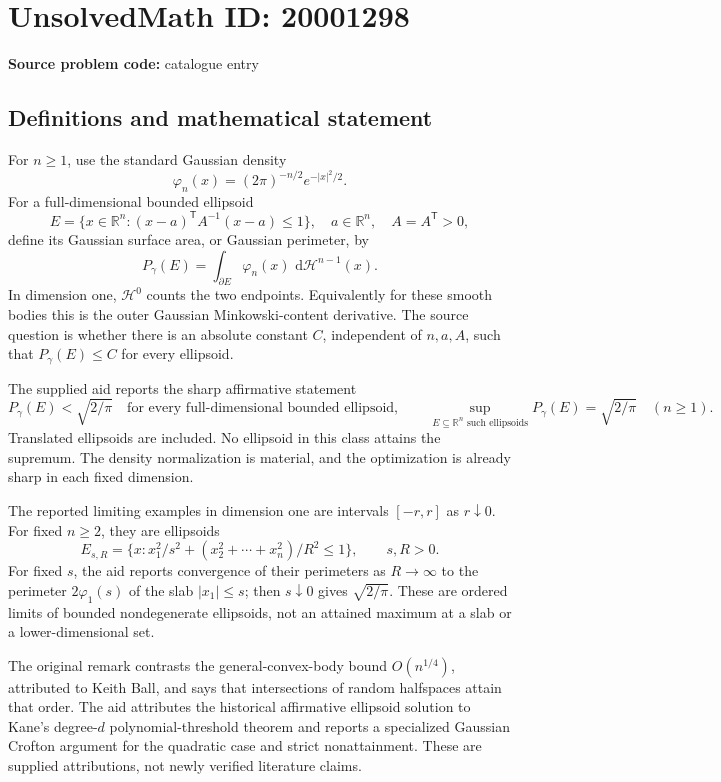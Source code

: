\documentclass[11pt]{article}
\newcommand{\R}{\mathbb{R}}
\newcommand{\dd}{\,\mathrm{d}}
\begin{document}
\section*{UnsolvedMath ID: 20001298}
\textbf{Source problem code:} catalogue entry
\subsection{Definitions and mathematical statement}
For \(n\geq1\), use the standard Gaussian density
\[
 \varphi_n(x)=(2\pi)^{-n/2}e^{-|x|^2/2}.
\]
For a full-dimensional bounded ellipsoid
\[
 E=\{x\in\R^n:(x-a)^{\mathsf T}A^{-1}(x-a)\leq1\},
 \quad a\in\R^n,\quad A=A^{\mathsf T}>0,
\]
define its Gaussian surface area, or Gaussian perimeter, by
\[
 P_\gamma(E)=\int_{\partial E}\varphi_n(x)\,\dd\mathcal H^{n-1}(x).
\]
In dimension one, \(\mathcal H^0\) counts the two endpoints. Equivalently for these smooth bodies this is the outer Gaussian Minkowski-content derivative. The source question is whether there is an absolute constant \(C\), independent of \(n,a,A\), such that \(P_\gamma(E)\leq C\) for every ellipsoid.

The supplied aid reports the sharp affirmative statement
\[
 P_\gamma(E)<\sqrt{2/\pi}\quad\text{for every full-dimensional bounded ellipsoid},
 \qquad
 \sup_{E\subseteq\R^n\text{ such ellipsoids}}P_\gamma(E)=\sqrt{2/\pi}
 \quad(n\geq1).
\]
Translated ellipsoids are included. No ellipsoid in this class attains the supremum. The density normalization is material, and the optimization is already sharp in each fixed dimension.

The reported limiting examples in dimension one are intervals \([-r,r]\) as \(r\downarrow0\). For fixed \(n\geq2\), they are ellipsoids
\[
 E_{s,R}=\{x:x_1^2/s^2+(x_2^2+\cdots+x_n^2)/R^2\leq1\},\qquad s,R>0.
\]
For fixed \(s\), the aid reports convergence of their perimeters as \(R\to\infty\) to the perimeter \(2\varphi_1(s)\) of the slab \(|x_1|\leq s\); then \(s\downarrow0\) gives \(\sqrt{2/\pi}\). These are ordered limits of bounded nondegenerate ellipsoids, not an attained maximum at a slab or a lower-dimensional set.

The original remark contrasts the general-convex-body bound \(O(n^{1/4})\), attributed to Keith Ball, and says that intersections of random halfspaces attain that order. The aid attributes the historical affirmative ellipsoid solution to Kane's degree-\(d\) polynomial-threshold theorem and reports a specialized Gaussian Crofton argument for the quadratic case and strict nonattainment. These are supplied attributions, not newly verified literature claims.
\end{document}
